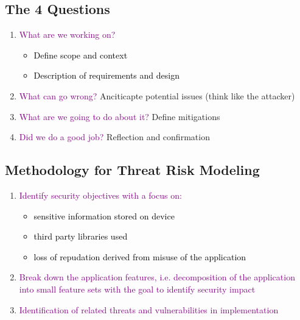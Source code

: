 \documentclass[main.tex,fontsize=8pt,paper=a4,paper=portrait,DIV=calc,]{scrartcl}
\begin{document}
\subsection{The 4 Questions}
\begin{enumerate}
\item \textcolor{purple}{What are we working on?}\newline
  \begin{itemize}
  \item \textcolor{black}{Define scope and context}
  \item \textcolor{black}{Description of requirements and design}
  \end{itemize} 
\item \textcolor{purple}{What can go wrong?}\newline
  Anciticapte potential issues (think like the attacker)
\item \textcolor{purple}{What are we going to do about it?}\newline
  Define mitigations
\item \textcolor{purple}{Did we do a good job?}\newline
  Reflection and confirmation
\end{enumerate} 

\subsection{Methodology for Threat Risk Modeling}
\begin{enumerate}
\item \textcolor{purple}{Identify security objectives with a focus on:}\newline
 \begin{itemize}
 \item \textcolor{black}{sensitive information stored on device}
 \item \textcolor{black}{third party libraries used}
 \item \textcolor{black}{loss of repudation derived from misuse of the application}
 \end{itemize} 
\item \textcolor{purple}{Break down the application features, i.e. decomposition of the application into small feature sets with the goal to identify security impact}
\item \textcolor{purple}{Identification of related threats and vulnerabilities in implementation}
\end{enumerate} 
\end{document}
